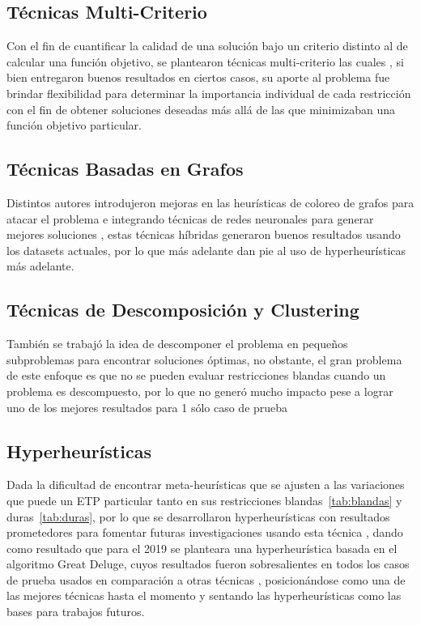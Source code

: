 \documentclass[letter, 10pt]{article}
\begin{document}
\subsection*{Técnicas Multi-Criterio}

Con el fin de cuantificar la calidad de una solución bajo un criterio distinto al de calcular una función objetivo, se plantearon técnicas multi-criterio las cuales \cite{10.1093/comjnl/7.2.117, 10.1007/3-540-44629-X_8}, si bien entregaron buenos resultados en ciertos casos, su aporte al problema fue brindar flexibilidad para determinar la importancia individual de cada restricción con el fin de obtener soluciones deseadas más allá de las que minimizaban una función objetivo particular.

\subsection*{Técnicas Basadas en Grafos}

Distintos autores introdujeron mejoras en las heurísticas de coloreo de grafos para atacar el problema \cite{Burke98asimple, Scheduling_solvingexamination} e integrando técnicas de redes neuronales para generar mejores soluciones \cite{10.1007/11844297_40}, estas técnicas híbridas generaron buenos resultados usando los datasets actuales, por lo que más adelante dan pie al uso de hyperheurísticas más adelante. 

\subsection*{Técnicas de Descomposición y Clustering}

También se trabajó la idea de descomponer el problema en pequeños subproblemas \cite{notfoundxd, 752921} para encontrar soluciones óptimas, no obstante, el gran problema de este enfoque es que no se pueden evaluar restricciones blandas cuando un problema es descompuesto, por lo que no generó mucho impacto pese a lograr uno de los mejores resultados para 1 sólo caso de prueba \cite{burkeadaptative}

\subsection*{Hyperheurísticas}

Dada la dificultad de encontrar meta-heurísticas que se ajusten a las variaciones que puede un ETP particular tanto en sus restricciones blandas~\ref{tab:blandas} y duras~\ref{tab:duras}, por lo que se desarrollaron hyperheurísticas con resultados prometedores para fomentar futuras investigaciones usando esta técnica \cite{prosss}, dando como resultado que para el 2019 se planteara una hyperheurística basada en el algoritmo Great Deluge, cuyos resultados fueron sobresalientes en todos los casos de prueba usados en comparación a otras técnicas \cite{MUKLASON2019647}, posicionándose como una de las mejores técnicas hasta el momento y sentando las hyperheurísticas como las bases para trabajos futuros.
\end{document}
